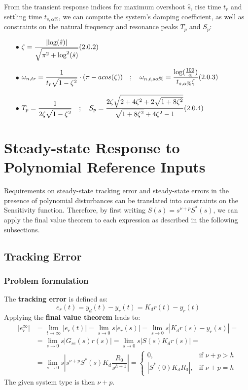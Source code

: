 \documentclass{article}
\numberwithin{equation}{subsection}
\begin{document}
	
	From the transient response indices for maximum overshoot $\hat{s}$, rise time $t_r$ and settling time $t_{s,\alpha\%}$, we can compute the system's damping coefficient, as well as constraints on the natural frequency and resonance peaks $T_p$ and $S_p$:
	\begin{enumerate}
		\item[$\bullet$] $\displaystyle \zeta = \frac{\left| \log (\hat{s}) \right|}{\sqrt{\pi^2 + \log^2 (\hat{s})}} \hfill (2.0.2)$
		\item[$\bullet$] $\displaystyle \omega_{n,tr} = \frac{1}{t_r\sqrt{1-\zeta^2}} \cdot (\pi - acos(\zeta)) \quad; \quad
		\omega_{n,t,s\alpha \%} = \frac{\log(\frac{100}{\alpha})}{t_{s,\alpha \%}\zeta} \hfill (2.0.3)$
		\item[$\bullet$] $\displaystyle T_p = \frac{1}{2\zeta \sqrt{1-\zeta^2}} \quad; \quad S_p = \frac{2\zeta \sqrt{2+4\zeta^2+2\sqrt{1+8\zeta^2}}}{\sqrt{1+8\zeta^2}+4\zeta^2-1} \hfill (2.0.4)$
	\end{enumerate}
	
	\section{Steady-state Response to Polynomial Reference Inputs}
	Requirements on steady-state tracking error and steady-state errors in the presence of polynomial disturbances can be translated into constraints on the Sensitivity function.
	Therefore, by first writing $S(s) = s^{\nu+p}S^*(s)$, we can apply the final value theorem to each expression as described in the following subsections.
	\subsection{Tracking Error}
	\subsubsection{Problem formulation}
	The \textbf{tracking error} is defined as:
	\begin{equation}
		e_r(t) = y_d(t)-y_r(t) = K_dr(t)-y_r(t)
	\end{equation}
	Applying the \textbf{final value theorem} leads to:
	\begin{align}
		\left| e_r^\infty \right| &= \displaystyle\lim_{t\to\infty} 	\left|e_r(t)\right| = \displaystyle\lim_{s\to0}s \left|e_r(s)\right| = \displaystyle\lim_{s\to0}s \left|K_dr(s)-y_r(s)\right| = \nonumber \\
		&= \displaystyle\lim_{s\to0}s \left|G_{re}(s)r(s)\right| = 	\displaystyle\lim_{s\to0}s \left|S(s)K_dr(s)\right| = \nonumber \\
		&= \displaystyle\lim_{s\to0}s 	\left|s^{\nu+p}S^*(s)K_d\dfrac{R_0}{s^{h+1}}\right| =
		\begin{cases}
			0, & \text{if } \nu+p>h \\
			\left|S^*(0)K_dR_0\right|, & \text{if } \nu+p = h
		\end{cases}
	\end{align}
	The given system type is then $\nu+p$.
\end{document}
